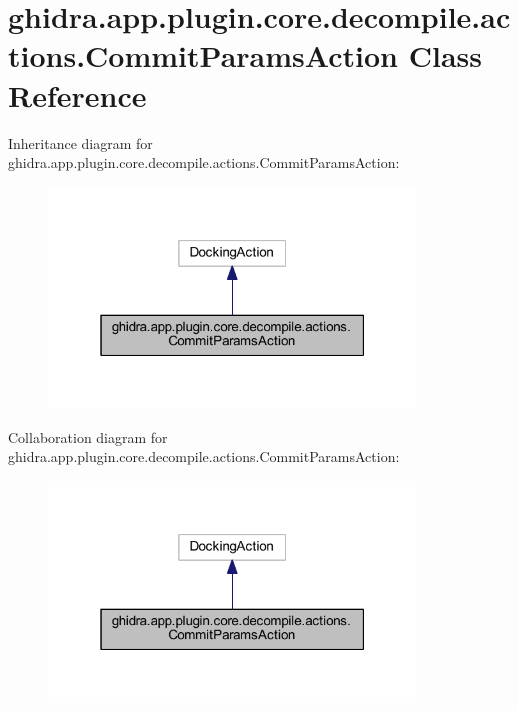 \hypertarget{classghidra_1_1app_1_1plugin_1_1core_1_1decompile_1_1actions_1_1_commit_params_action}{}\section{ghidra.\+app.\+plugin.\+core.\+decompile.\+actions.\+Commit\+Params\+Action Class Reference}
\label{classghidra_1_1app_1_1plugin_1_1core_1_1decompile_1_1actions_1_1_commit_params_action}


Inheritance diagram for ghidra.\+app.\+plugin.\+core.\+decompile.\+actions.\+Commit\+Params\+Action\+:
\nopagebreak
\begin{figure}[H]
\begin{center}
\leavevmode
\includegraphics[width=277pt]{classghidra_1_1app_1_1plugin_1_1core_1_1decompile_1_1actions_1_1_commit_params_action__inherit__graph}
\end{center}
\end{figure}


Collaboration diagram for ghidra.\+app.\+plugin.\+core.\+decompile.\+actions.\+Commit\+Params\+Action\+:
\nopagebreak
\begin{figure}[H]
\begin{center}
\leavevmode
\includegraphics[width=277pt]{classghidra_1_1app_1_1plugin_1_1core_1_1decompile_1_1actions_1_1_commit_params_action__coll__graph}
\end{center}
\end{figure}
